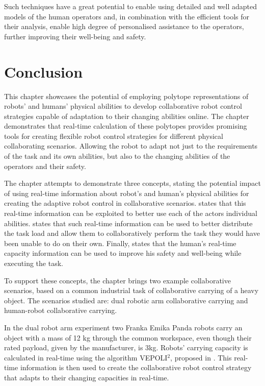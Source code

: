 Such techniques have a great potential to enable using detailed and well adapted models of the human operators and, in combination with the efficient tools for their analysis, enable high degree of personalised assistance to the operators, further improving their well-being and safety.


\section{Conclusion}

This chapter showcases the potential of employing polytope representations of robots' and humans' physical abilities to develop collaborative robot control strategies capable of adaptation to their changing abilities online. The chapter demonstrates that real-time calculation of these polytopes provides promising tools for creating flexible robot control strategies for different physical collaborating scenarios. Allowing the robot to adapt not just to the requirements of the task and its own abilities, but also to the changing abilities of the operators and their safety.

The chapter attempts to demonstrate three concepts, stating the potential impact of using real-time information about robot's and human's physical abilities for creating the adaptive robot control in collaborative scenarios.  states that this real-time information can be exploited to better use each of the actors individual abilities. 
 states that such real-time information can be used to better distribute the task load and allow them to collaboratively perform the task they would have been unable to do on their own. Finally,  states that the human's real-time capacity information can be used to improve his safety and well-being while executing the task.

To support these concepts, the chapter brings two example collaborative scenarios, based on a common industrial task of collaborative carrying of a heavy object. The scenarios studied are: dual robotic arm collaborative carrying and human-robot collaborative carrying. 

In the dual robot arm experiment two Franka Emika Panda robots carry an object with a mass of 12 kg through the common workspace, even though their rated payload, given by the manufacturer, is 3kg. 
Robots' carrying capacity is calculated in real-time using the algorithm VEPOLI$^2$, proposed in . This real-time information is then used to create the collaborative robot control strategy that adapts to their changing capacities in real-time.

